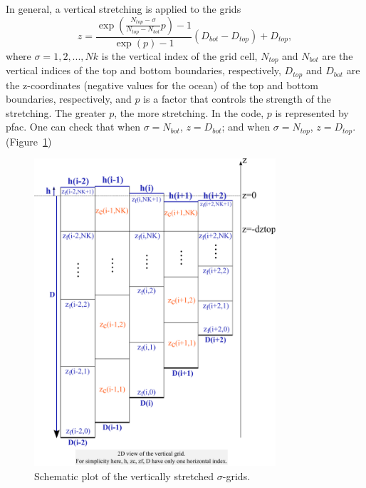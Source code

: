 \documentclass[12pt,letterpaper,titlepage]{article}
\newcommand{\Blue}[1]{{\color{blue}#1}}
\begin{document}
In general, a vertical stretching is applied to the grids
\begin{equation}
  z = \frac{\exp\left(\frac{N_{top}-\sigma}{N_{top} - N_{bot}} p\right) - 1}{\exp(p)-1} (D_{bot} - D_{top}) +D_{top}, \label{eq:z}
\end{equation}
where $\sigma=1,2,...,Nk$ is the vertical index of the grid cell, $N_{top}$ and $N_{bot}$ are the vertical indices of the top and bottom boundaries, respectively, $D_{top}$ and $D_{bot}$ are the z-coordinates (negative values for the ocean) of the top and bottom boundaries, respectively, and $p$ is a factor that controls the strength of the stretching. The greater $p$, the more stretching. In the code, $p$ is represented by \Blue{pfac}. One can check that when $\sigma = N_{bot}$, $z =D_{bot}$; and when $\sigma = N_{top}$, $z =D_{top}$. (Figure~\ref{grid_original})\par

\begin{figure}[hbt]
\centering 
  \includegraphics[width=0.8\textwidth]{grid_z.pdf}
  \caption{Schematic plot of the vertically stretched $\sigma$-grids.}
  \label{grid_original}
\end{figure}
\end{document}
